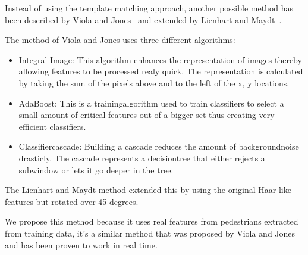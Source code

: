 \documentclass{article}
\begin{document}
Instead of using the template matching approach, another possible method has been described by Viola and Jones~\cite{viola2001rapid} and extended by Lienhart and Maydt~\cite{lienhart2002extended}.
\par
The method of Viola and Jones uses three different algorithms:
\begin{itemize}
\item Integral Image: This algorithm enhances the representation of images thereby allowing features to be processed realy quick. The representation is calculated by taking the sum of the pixels above and to the left of the x, y locations.
\item AdaBoost: This is a trainingalgorithm used to train classifiers to select a small amount of critical features out of a bigger set thus creating very efficient classifiers.
\item Classifiercascade: Building a cascade reduces the amount of backgroundnoise drasticly. The cascade represents a decisiontree that either rejects a subwindow or lets it go deeper in the tree.
\end{itemize}
The Lienhart and Maydt method extended this by using the original Haar-like features but rotated over 45 degrees.

We propose this method because it uses real features from pedestrians extracted from training data, it's a similar method that was proposed by Viola and Jones~\cite{viola2001rapid} and has been proven to work in real time.
\end{document}
